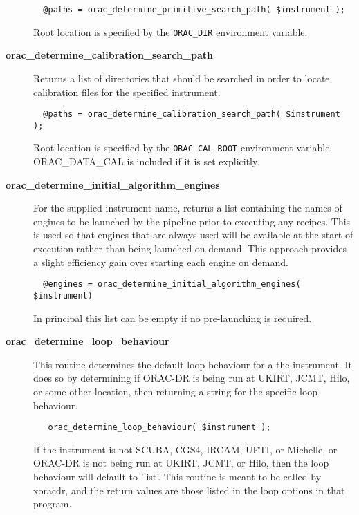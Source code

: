 \begin{description}
\begin{verbatim}
  @paths = orac_determine_primitive_search_path( $instrument );
\end{verbatim}


Root location is specified by the \texttt{ORAC\_DIR} environment
variable.


\item[{\textbf{orac\_determine\_calibration\_search\_path}}] \mbox{}

Returns a list of directories that should be searched in order
to locate calibration files for the specified instrument.

\begin{verbatim}
  @paths = orac_determine_calibration_search_path( $instrument );
\end{verbatim}


Root location is specified by the \texttt{ORAC\_CAL\_ROOT} environment
variable. ORAC\_DATA\_CAL is included if it is set explicitly.


\item[{\textbf{orac\_determine\_initial\_algorithm\_engines}}] \mbox{}

For the supplied instrument name, returns a list containing the names
of engines to be launched by the pipeline prior to executing any
recipes. This is used so that engines that are always used will be
available at the start of execution rather than being launched on
demand. This approach provides a slight efficiency gain over starting
each engine on demand.

\begin{verbatim}
  @engines = orac_determine_initial_algorithm_engines( $instrument)
\end{verbatim}


In principal this list can be empty if no pre-launching is required.


\item[{\textbf{orac\_determine\_loop\_behaviour}}] \mbox{}

This routine determines the default loop behaviour for a the instrument.
It does so by determining if ORAC-DR is being run at UKIRT, JCMT, Hilo,
or some other location, then returning a string for the specific loop
behaviour.

\begin{verbatim}
   orac_determine_loop_behaviour( $instrument );
\end{verbatim}


If the instrument is not SCUBA, CGS4, IRCAM, UFTI, or Michelle, or
ORAC-DR is not being run at UKIRT, JCMT, or Hilo, then the loop behaviour
will default to 'list'. This routine is meant to be called by xoracdr,
and the return values are those listed in the loop options in that
program.



\end{description}
